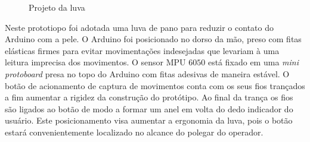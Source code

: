 \begin{figure}[ht]
    \centering
        \hspace{0.5cm}
        \caption{Projeto da luva}
        \label{fig:luva}
\end{figure}

Neste prototiopo foi adotada uma luva de pano para reduzir o contato do Arduino com a pele.
O Arduino foi posicionado no dorso da mão, preso com fitas elásticas firmes para evitar movimentações indesejadas que levariam à uma leitura imprecisa dos movimentos.
% 
O sensor MPU $6050$ está fixado em uma \textit{mini protoboard} presa no topo do Arduino com fitas adesivas de maneira estável. O botão de acionamento de captura de movimentos conta com os seus fios trançados a fim aumentar a rigidez da construção do protótipo. Ao final da trança os fios são ligados ao botão de modo a formar um anel em volta do dedo indicador do usuário. Este posicionamento visa aumentar a ergonomia da luva, pois o botão estará convenientemente localizado no alcance do polegar do operador.

